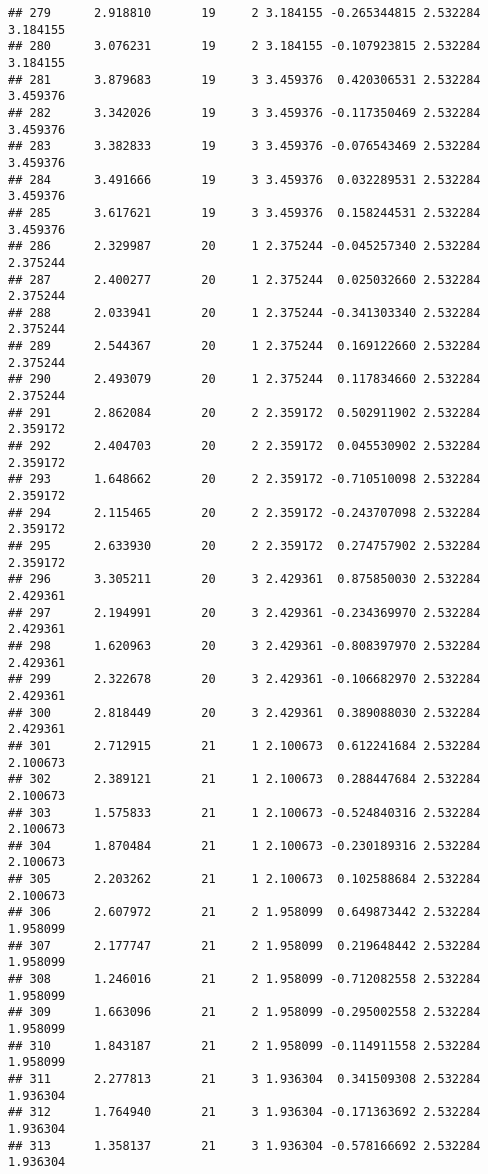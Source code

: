 \documentclass[]{book}
\theoremstyle{definition}
\theoremstyle{definition}
\theoremstyle{definition}
\theoremstyle{remark}
\begin{document}
\begin{verbatim}
## 279      2.918810       19     2 3.184155 -0.265344815 2.532284 3.184155
## 280      3.076231       19     2 3.184155 -0.107923815 2.532284 3.184155
## 281      3.879683       19     3 3.459376  0.420306531 2.532284 3.459376
## 282      3.342026       19     3 3.459376 -0.117350469 2.532284 3.459376
## 283      3.382833       19     3 3.459376 -0.076543469 2.532284 3.459376
## 284      3.491666       19     3 3.459376  0.032289531 2.532284 3.459376
## 285      3.617621       19     3 3.459376  0.158244531 2.532284 3.459376
## 286      2.329987       20     1 2.375244 -0.045257340 2.532284 2.375244
## 287      2.400277       20     1 2.375244  0.025032660 2.532284 2.375244
## 288      2.033941       20     1 2.375244 -0.341303340 2.532284 2.375244
## 289      2.544367       20     1 2.375244  0.169122660 2.532284 2.375244
## 290      2.493079       20     1 2.375244  0.117834660 2.532284 2.375244
## 291      2.862084       20     2 2.359172  0.502911902 2.532284 2.359172
## 292      2.404703       20     2 2.359172  0.045530902 2.532284 2.359172
## 293      1.648662       20     2 2.359172 -0.710510098 2.532284 2.359172
## 294      2.115465       20     2 2.359172 -0.243707098 2.532284 2.359172
## 295      2.633930       20     2 2.359172  0.274757902 2.532284 2.359172
## 296      3.305211       20     3 2.429361  0.875850030 2.532284 2.429361
## 297      2.194991       20     3 2.429361 -0.234369970 2.532284 2.429361
## 298      1.620963       20     3 2.429361 -0.808397970 2.532284 2.429361
## 299      2.322678       20     3 2.429361 -0.106682970 2.532284 2.429361
## 300      2.818449       20     3 2.429361  0.389088030 2.532284 2.429361
## 301      2.712915       21     1 2.100673  0.612241684 2.532284 2.100673
## 302      2.389121       21     1 2.100673  0.288447684 2.532284 2.100673
## 303      1.575833       21     1 2.100673 -0.524840316 2.532284 2.100673
## 304      1.870484       21     1 2.100673 -0.230189316 2.532284 2.100673
## 305      2.203262       21     1 2.100673  0.102588684 2.532284 2.100673
## 306      2.607972       21     2 1.958099  0.649873442 2.532284 1.958099
## 307      2.177747       21     2 1.958099  0.219648442 2.532284 1.958099
## 308      1.246016       21     2 1.958099 -0.712082558 2.532284 1.958099
## 309      1.663096       21     2 1.958099 -0.295002558 2.532284 1.958099
## 310      1.843187       21     2 1.958099 -0.114911558 2.532284 1.958099
## 311      2.277813       21     3 1.936304  0.341509308 2.532284 1.936304
## 312      1.764940       21     3 1.936304 -0.171363692 2.532284 1.936304
## 313      1.358137       21     3 1.936304 -0.578166692 2.532284 1.936304

\end{verbatim}
\end{document}
